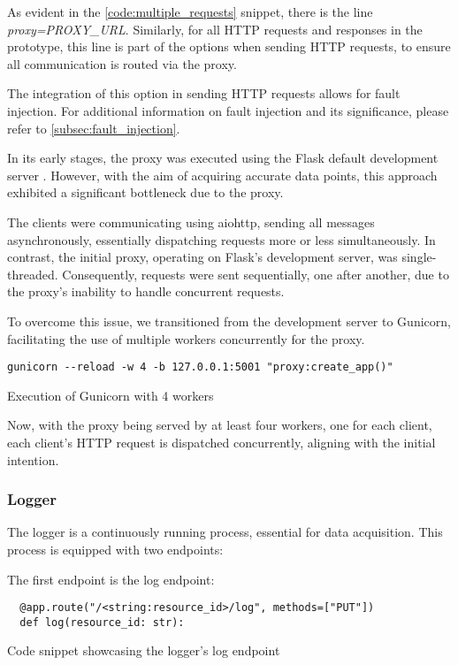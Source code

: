 As evident in the \ref{code:multiple_requests} snippet, there is the line \textit{proxy=PROXY\_URL}. Similarly, for all HTTP requests and responses in the prototype, this line is part of the options when sending HTTP requests, to ensure all communication is routed via the proxy.

The integration of this option in sending HTTP requests allows for fault injection. For additional information on fault injection and its significance, please refer to \ref{subsec:fault_injection}.

In its early stages, the proxy was executed using the Flask default development server \cite{flask_dev_server}. However, with the aim of acquiring accurate data points, this approach exhibited a significant bottleneck due to the proxy.

The clients were communicating using aiohttp, sending all messages asynchronously, essentially dispatching requests more or less simultaneously. In contrast, the initial proxy, operating on Flask's development server, was single-threaded. Consequently, requests were sent sequentially, one after another, due to the proxy's inability to handle concurrent requests.

To overcome this issue, we transitioned from the development server to Gunicorn, facilitating the use of multiple workers concurrently for the proxy.

\begin{listing}[!ht]
  \begin{verbatim}
gunicorn --reload -w 4 -b 127.0.0.1:5001 "proxy:create_app()"
  \end{verbatim}
  \caption{Execution of Gunicorn with 4 workers}
\end{listing}

Now, with the proxy being served by at least four workers, one for each client, each client's HTTP request is dispatched concurrently, aligning with the initial intention.

\subsubsection{Logger}

The logger is a continuously running process, essential for data acquisition. This process is equipped with two endpoints:

The first endpoint is the log endpoint:

\begin{listing}[!ht]
  \begin{verbatim}
  @app.route("/<string:resource_id>/log", methods=["PUT"])
  def log(resource_id: str):
  \end{verbatim}
  \caption{Code snippet showcasing the logger's log endpoint}
  \label{code:logger_log}
\end{listing}

